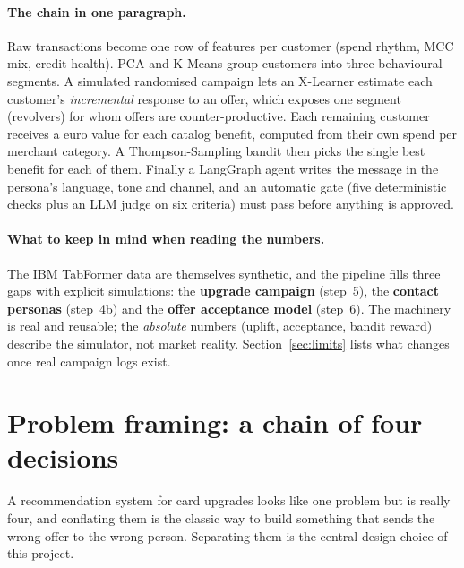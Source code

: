 \documentclass[11pt,a4paper]{article}
\begin{document}
\paragraph{The chain in one paragraph.}
Raw transactions become one row of features per customer (spend rhythm, MCC mix, credit health). PCA and K-Means
group customers into three behavioural segments. A simulated randomised campaign lets an X-Learner estimate each
customer's \emph{incremental} response to an offer, which exposes one segment (revolvers) for whom offers are
counter-productive. Each remaining customer receives a euro value for each catalog benefit, computed from their own
spend per merchant category. A Thompson-Sampling bandit then picks the single best benefit for each of them. Finally
a LangGraph agent writes the message in the persona's language, tone and channel, and an automatic gate (five
deterministic checks plus an LLM judge on six criteria) must pass before anything is approved.

\paragraph{What to keep in mind when reading the numbers.}
The IBM TabFormer data are themselves synthetic, and the pipeline fills three gaps with explicit
simulations: the \textbf{upgrade campaign} (step~5), the \textbf{contact personas} (step~4b) and the
\textbf{offer acceptance model} (step~6). The machinery is real and reusable; the \emph{absolute} numbers
(uplift, acceptance, bandit reward) describe the simulator, not market reality. Section~\ref{sec:limits} lists
what changes once real campaign logs exist.

\section{Problem framing: a chain of four decisions}

A recommendation system for card upgrades looks like one problem but is really four, and conflating them is the
classic way to build something that sends the wrong offer to the wrong person. Separating them is the central design
choice of this project.
\end{document}
